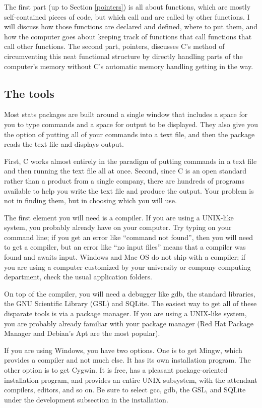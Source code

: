\documentclass[12pt]{article}
\makeatletter
\def\ttind#1{\index{#1@\cinline{#1}}\cinline{#1}}
\makeatother
\begin{document}
The first part (up to Section \ref{pointers})
is all about functions, which are mostly self-contained pieces of code,
but which call and are called by other functions. I will discuss how
those functions are declared and defined, where to put them, and how the
computer goes about keeping track of functions that call functions that
call other functions. The second part, pointers, discusses C's method
of circumventing this neat functional structure by directly handling
parts of the computer's memory without C's automatic memory handling
getting in the way.

\subsection{The tools} 
Most stats packages are built around a single window that includes a
space for you to type commands and a space for output to be displayed.
They also give you the option of putting all of your commands into a
text file, and then the package reads the text file and displays output.

First, C works almost entirely in the paradigm of putting commands in a
text file and then running the text file all at once. Second, since
C is an open standard rather than a product from a single company, there
are hundreds of programs available to help you write the text file and
produce the output. Your problem is not in finding them, but in choosing
which you will use.

The first element you will need is a compiler. If you are using
a UNIX-like system, you probably already have \ttind{gcc} on your
computer. Try typing  on your command line; if you get an
error like ``command not found'', then you will need to get a compiler,
but an error like ``no input files'' means that a compiler was found
and awaits input. Windows and Mac OS do not ship with a compiler; if you
are using a computer customized by your university or company computing
department, check the usual application folders.

On top of the compiler, you will need a debugger like gdb, the standard
libraries, the GNU Scientific Library (GSL) and SQLite.  The easiest
way to get all of these disparate tools is via a package manager. If
you are using a UNIX-like system, you are probably already familiar with
your package manager (Red Hat Package Manager and Debian's Apt are the
most popular).

If you are using Windows, you have two options. One is to get
Mingw, which provides a compiler and not much else. It has its
own installation program. The other option is to get Cygwin.
It is free, has a pleasant package-oriented
installation program, and provides an entire UNIX subsystem, with the
attendant compilers, editors, and so on. Be sure to select gcc, gdb,
the GSL, and SQLite under the development subsection in the installation.
\end{document}
